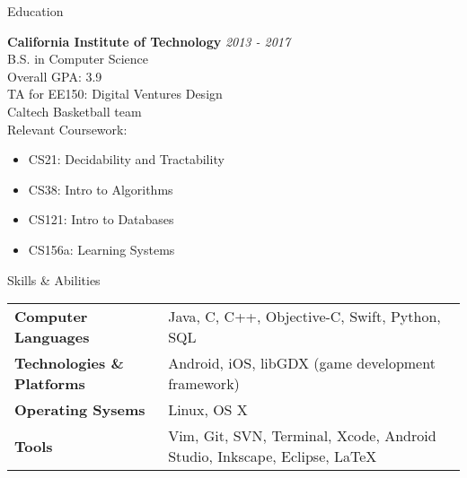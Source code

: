 \documentclass{resume} %
\begin{document}

\begin{rSection}{Education}

{\bf California Institute of Technology} \hfill {\em 2013 - 2017} \\
B.S. in Computer Science \smallskip \\
Overall GPA: 3.9 \\
TA for EE150: Digital Ventures Design \\
Caltech Basketball team \smallskip \\
Relevant Coursework:
\vspace{-5.0mm}
\begin{minipage}{0.4\linewidth}
\begin{itemize}
\item{CS21: Decidability and Tractability}
\item{CS38: Intro to Algorithms}
\end{itemize}
\end{minipage}
\begin{minipage}{0.4\linewidth}
\begin{itemize}
\item{CS121: Intro to Databases}
\item{CS156a: Learning Systems}
\end{itemize}
\end{minipage}
\vspace{2mm}
\end{rSection}


\begin{rSection}{Skills \& Abilities}

\begin{tabularx}{\textwidth}{@{}lX}
    \bfseries{Computer Languages}   &  Java, C, C++, Objective-C, Swift, Python,
    SQL \\
    \bfseries{Technologies \& Platforms}   &  Android, iOS, libGDX (game development
    framework) \\
    \bfseries{Operating Sysems}   &  Linux, OS X \\
    \bfseries{Tools}   &  Vim, Git, SVN, Terminal, Xcode, Android Studio, Inkscape,
    Eclipse, \LaTeX \\
\end{tabularx}

\end{rSection}
\end{document}

